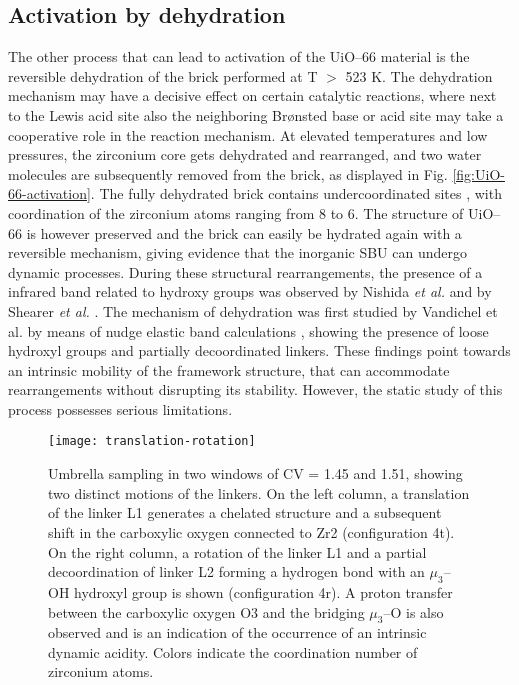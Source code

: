\subsection*{Activation by dehydration}
The other process that can lead to activation of the UiO--66 material is the reversible dehydration of the brick performed at T $>$ 523 K. The dehydration mechanism may have a decisive effect on certain catalytic reactions, where next to the Lewis acid site also the neighboring Br\o{}nsted base or acid site may take a cooperative role in the reaction mechanism. At elevated temperatures and low pressures, the zirconium core gets dehydrated and rearranged, and two water molecules are subsequently removed from the brick, as displayed in Fig. \ref{fig:UiO-66-activation}. The fully dehydrated  brick contains undercoordinated sites \cite{valenzano2011disclosing, decoste2013stability, shearer2013situ, vandichel2015active}, with coordination of the zirconium atoms ranging from 8 to 6. The structure of UiO--66 is however preserved and the brick can easily be hydrated again with a reversible mechanism, giving evidence that the inorganic SBU can undergo dynamic processes. During these structural rearrangements, the presence of a infrared band related to hydroxy groups was observed by Nishida \textit{et al.} \cite{nishida2014structural} and by Shearer \textit{et al.} \cite{shearer2013situ}. The mechanism of dehydration was first studied by Vandichel et al. by means of nudge elastic band calculations \cite{vandichel2016water}, showing the presence of loose hydroxyl groups and partially decoordinated linkers. These findings point towards an intrinsic mobility of the framework structure, that can accommodate rearrangements without disrupting its stability. However, the static study of this process possesses serious limitations. 
\begin{figure}[!htbp]
	\centering
	\texttt{[image: translation-rotation]}
	\caption{Umbrella sampling in two windows of CV = 1.45 and 1.51, showing two distinct motions of the linkers. On the left column, a translation of the linker L1 generates a chelated structure and a subsequent shift in the carboxylic oxygen connected to Zr2 (configuration 4t). On the right column, a rotation of the linker L1 and a partial decoordination of linker L2 forming a hydrogen bond with an $\mu_3$--OH hydroxyl group is shown (configuration 4r). A proton transfer between the carboxylic oxygen O3 and the bridging $\mu_3$--O is also observed and is an indication of the occurrence of an intrinsic dynamic acidity. Colors indicate the coordination number of zirconium atoms.}
	\label{fig:translation-rotation}
\end{figure}
